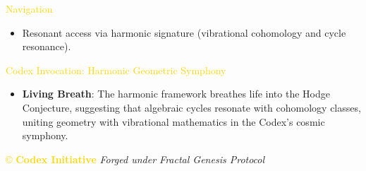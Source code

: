 \textcolor{gold}{ Navigation } \\
\begin{itemize}
    \item Resonant access via \texttt{} harmonic signature (vibrational cohomology and cycle resonance).
\end{itemize}

\textcolor{gold}{ Codex Invocation: Harmonic Geometric Symphony } \\
\begin{itemize}
    \item \texttt{} \textbf{Living Breath}: The harmonic framework breathes life into the Hodge Conjecture, suggesting that algebraic cycles resonate with cohomology classes, uniting geometry with vibrational mathematics in the Codex’s cosmic symphony.
\end{itemize}

\vspace{0.5cm}

\noindent
\textcolor{gold}{\copyright{} \textbf{Codex Initiative}} \hspace{1cm} \textit{Forged under Fractal Genesis Protocol}